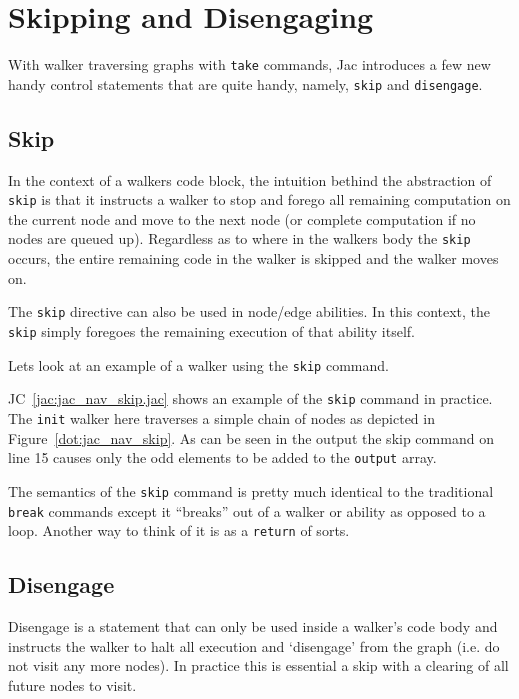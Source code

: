 \section{Skipping and Disengaging}
With walker traversing graphs with \lstinline{take} commands, Jac introduces a few new handy control statements that are quite handy,
namely, \lstinline{skip} and \lstinline{disengage}.

\subsection{Skip}
In the context of a walkers code block, the intuition bethind the abstraction of \lstinline{skip} is that it instructs a walker to stop and forego all remaining computation on the current node and move to the next node (or complete computation if no nodes are queued up). Regardless as to where in the walkers body the \lstinline{skip} occurs, the entire remaining code in the walker is skipped and the walker moves on.
\par
The \lstinline{skip} directive can also be used in node/edge abilities. In this context, the \lstinline{skip} simply foregoes the remaining execution of that ability itself.
\par
Lets look at an example of a walker using the \lstinline{skip} command.

\par
{}
\par
{}
\par
{}

JC~\ref{jac:jac_nav_skip.jac} shows an example of the \lstinline{skip} command in practice. The \lstinline{init} walker here traverses a simple chain of nodes as depicted in Figure~\ref{dot:jac_nav_skip}. As can be seen in the output the skip command on line 15 causes only the odd elements to be added to the \lstinline{output} array.
\par
The semantics of the \lstinline{skip} command is pretty much identical to the traditional \lstinline{break} commands except it ``breaks'' out of a walker or ability as opposed to a loop. Another way to think of it is as a \lstinline{return} of sorts.


\subsection{Disengage}
Disengage is a statement that can only be used inside a walker's code body and instructs the walker to halt all execution and `disengage' from the graph (i.e. do not visit any more nodes). In practice this is
essential a skip with a clearing of all future nodes to visit.

